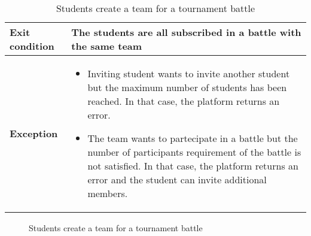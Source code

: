 \begin{enumerate}[label=\textbf{UC\arabic*}:,ref=UC\arabic*,leftmargin=1.3cm]
{\begin{table}[H]
\begin{tabular}{|l|p{11.9cm}|}
                        \textbf{Exit condition}  & The students are all subscribed in a battle with the same team                                                            \\\hline
                        \textbf{Exception}       & \begin{itemize}
                                                         \item Inviting student wants to invite another student but the maximum number of students has been reached.
                                                               In that case, the platform returns an error.
                                                         \item The team wants to partecipate in a battle but the number of participants requirement of the battle is not satisfied.
                                                               In that case, the platform returns an error and the student can invite additional members.
                                                   \end{itemize} \\\hline
                  \end{tabular}
                  \caption{Students create a team for a tournament battle}
                  \label{table:Students create a team for a tournament battle}
            \end{table}
            \pagebreak
            \begin{figure}[H]
                  \centering
                  \caption{Students create a team for a tournament battle}
                  \label{fig:Students create a team for a tournament battle}
            \end{figure}
            \pagebreak
      }
\end{enumerate}
